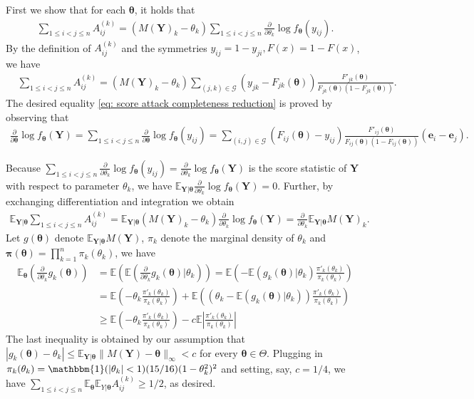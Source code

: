 \documentclass[letterpaper,12pt]{article}
\numberwithin{equation}{section}
\theoremstyle{plain}
\numberwithin{Theorem}{section}
\numberwithin{corollary}{section}
\numberwithin{proposition}{section}
\numberwithin{Lemma}{section}
{
	\theoremstyle{definition}
	\newtheorem{Definition}{Definition}
	\newtheorem{example}{Example}
	\numberwithin{example}{section}
	\newtheorem{fact}{Fact}
	\numberwithin{fact}{section}
	\newtheorem{remark}{Remark}
}
\newcommand{\1}{\mathbbm{1}}
\def\bth{{\boldsymbol{\theta}}}
\def\E{\mathbb{E}}
\begin{document}
	First we show that for each $\bth$, it holds that
	\begin{align}\label{eq: score attack completeness reduction}
		\sum_{1 \leq i < j \leq n}  A^{(k)}_{ij} = (M(\bm Y)_k - \theta_k) \sum_{1 \leq i < j \leq n} \frac{\partial}{\partial\theta_k} \log f_{\bth}(y_{ij}).
	\end{align}
	By the definition of $A^{(k)}_{ij}$ and the symmetries $y_{ij} = 1 - y_{ji}, F(x) = 1 - F(x)$, we have 
	\begin{align*}
		&\sum_{1 \leq i < j \leq n} A^{(k)}_{ij} = (M(\bm Y)_k - \theta_k) \sum_{(j, k) \in \mathcal G}(y_{jk} - F_{jk}(\bth))\frac{F'_{jk}(\bth)}{F_{jk}(\bth)(1 - F_{jk}(\bth))}.
	\end{align*}
	The desired equality \eqref{eq: score attack completeness reduction} is proved by observing that 
	\begin{align*}
		\frac{\partial}{\partial\bth}\log f_{\bth}(\bm Y) = \sum_{1 \leq i < j \leq n} \frac{\partial}{\partial\bth} \log f_{\bth}(y_{ij}) = \sum_{(i, j) \in \mathcal G} (F_{ij}(\bth) - y_{ij})\frac{F'_{ij}(\bth)}{F_{ij}(\bth)(1 - F_{ij}(\bth))}(\bm e_i - \bm e_j).
	\end{align*}
	
	Because $\sum_{1 \leq i < j \leq n} \frac{\partial}{\partial\theta_k} \log f_{\bth}(y_{ij}) = \frac{\partial}{\partial \theta_k} \log f_\bth (\bm Y)$ is the score statistic of $\bm Y$ with respect to parameter $\theta_k$, we have $\E_{\bm Y|\bth} \frac{\partial}{\partial \theta_k} \log f_\bth (\bm Y) = 0$. Further, by exchanging differentiation and integration we obtain
	\begin{align*}
		\E_{\bm Y|\bth} \sum_{1 \leq i < j \leq n}  A^{(k)}_{ij} = \E_{\bm Y|\bth} (M(\bm Y)_k - \theta_k) \frac{\partial}{\partial \theta_k} \log f_\bth (\bm Y) = \frac{\partial}{\partial\theta_k} \E_{\bm Y|\bth} M(\bm Y)_k.
	\end{align*}
	Let $g(\bth)$ denote $\E_{\bm Y|\bth} M(\bm Y)$, $\pi_k$ denote the marginal density of $\theta_k$ and $\bm \pi (\bth)= \prod_{k=1}^n \pi_k(\theta_k)$, we have
	\begin{align*}
		\E_\bth\left(\frac{\partial}{\partial\theta_k}g_k(\bm \theta)\right) &= \E\left(\E\left(\frac{\partial}{\partial\theta_k}g_k(\bm \theta)\Big|\theta_k\right)\right) = \E\left(-\E\left(g_k(\bm \theta)|\theta_k\right)\frac{\pi'_k(\theta_k)}{\pi_k(\theta_k)}\right) \\
		&= \E\left(-\theta_k\frac{\pi'_k(\theta_k)}{\pi_k(\theta_k)}\right) + \E\left(\left(\theta_k-\E\left(g_k(\bm \theta)|\theta_k\right)\right)\frac{\pi'_k(\theta_k)}{\pi_k(\theta_k)}\right)\\
		&\geq \E\left(-\theta_k\frac{\pi'_k(\theta_k)}{\pi_k(\theta_k)}\right) - c \E\left|\frac{\pi'_k(\theta_k)}{\pi_k(\theta_k)}\right|
	\end{align*}
	The last inequality is obtained by our assumption that $|g_k(\bth) - \theta_k| \leq \E_{\bm Y|\bth} \|M(\bm Y) - \bth\|_\infty < c$ for every $\bth \in \Theta$. Plugging in $\pi_k(\theta_k) = \1(|\theta_k| < 1)(15/16)(1-\theta_k^2)^2$ and setting, say, $c = 1/4$, we have $\sum_{1 \leq i < j \leq n} \E_\bth \E_{Y|\bth} A^{(k)}_{ij} \geq 1/2$, as desired.
\end{document}

